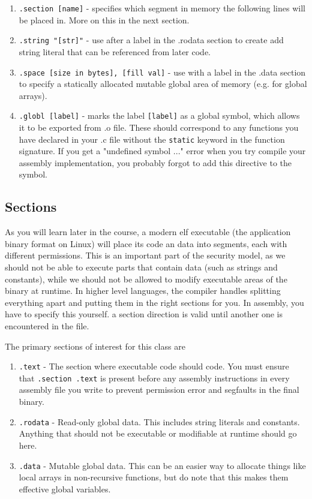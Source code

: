 \documentclass[11pt]{article}
\begin{document}
\begin{enumerate}
    \item \texttt{.section [name]} - specifies which segment in memory the following lines
        will be placed in. More on this in the next section.
    \item \texttt{.string "[str]"} - use after a label in the .rodata section to create add
        string literal that can be referenced from later code.
    \item \texttt{.space [size in bytes], [fill val]} - use with a label in the .data
        section to specify a statically allocated mutable global area of memory (e.g. for
        global arrays).
    \item \texttt{.globl [label]} - marks the label \texttt{[label]} as a global symbol,
        which allows it to be exported from .o file. These should correspond to any
        functions you have declared in your .c file without the \texttt{static} keyword in
        the function signature. If you get a "undefined symbol ..." error when you try
        compile your assembly implementation, you probably forgot to add this directive to
        the symbol.
\end{enumerate}

\subsection{Sections}

As you will learn later in the course, a modern elf executable (the application binary
format on Linux) will place its code an data into segments, each with different
permissions. This is an important part of the security model, as we should not be able to
execute parts that contain data (such as strings and constants), while we should not be
allowed to modify executable areas of the binary at runtime. In higher level languages,
the compiler handles splitting everything apart and putting them in the right sections for
you. In assembly, you have to specify this yourself. a section direction is valid until
another one is encountered in the file.

The primary sections of interest for this class are

\begin{enumerate}
    \item \texttt{.text} - The section where executable code should code. You must ensure
        that \texttt{.section .text} is present before any assembly instructions in every
        assembly file you write to prevent permission error and segfaults in the final
        binary.
    \item \texttt{.rodata} - Read-only global data. This includes string literals and constants.
        Anything that should not be executable or modifiable at runtime should go here.
    \item \texttt{.data} - Mutable global data. This can be an easier way to allocate things
        like local arrays in non-recursive functions, but do note that this makes them
        effective global variables.
\end{enumerate}
\end{document}
